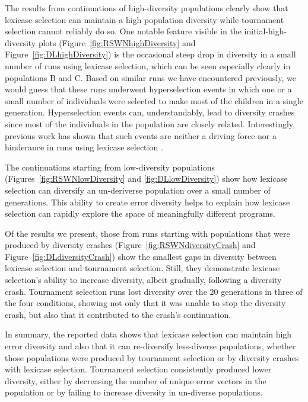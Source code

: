 \documentclass{sig-alternate-05-2015}
\begin{document}
The results from continuations of high-diversity populations clearly show that lexicase selection can maintain a high population diversity while tournament selection cannot reliably do so. One notable feature visible in the initial-high-diversity plots (Figure~\ref{fig:RSWNhighDiversity} and Figure~\ref{fig:DLhighDiversity}) is the occasional steep drop in diversity in a small number of runs using lexicase selection, which can be seen especially clearly in populations B and C. Based on similar runs we have encountered previously, we would guess that these runs underwent hyperselection events in which one or a small number of individuals were selected to make most of the children in a single generation. Hyperselection events can, understandably, lead to diversity crashes since most of the individuals in the population are closely related. Interestingly, previous work has shown that such events are neither a driving force nor a hinderance in runs using lexicase selection \cite{Helmuth:2016:GECCO}.

The continuations starting from low-diversity populations (Figures~\ref{fig:RSWNlowDiversity} and \ref{fig:DLlowDiversity}) show how lexicase selection can diversify an un-deriverse population over a small number of generations. This ability to create error diversity helps to explain how lexicase selection can rapidly explore the space of meaningfully different programs.


Of the results we present, those from runs starting with populations that were produced by diversity crashes (Figure~\ref{fig:RSWNdiversityCrash} and Figure~\ref{fig:DLdiversityCrash}) show the smallest gaps in diversity between lexicase selection and tournament selection. Still, they demonstrate lexicase selection's ability to increase diversity, albeit gradually, following a diversity crash. Tournament selection runs lost diversity over the 20 generations in three of the four conditions, showing not only that it was unable to stop the diversity crash, but also that it contributed to the crash's continuation.

In summary, the reported data shows that lexicase selection can maintain high error diversity and also that it can re-diversify less-diverse populations, whether those populations were produced by tournament selection or by diversity crashes with lexicase selection. Tournament selection consistently produced lower diversity, either by decreasing the number of unique error vectors in the population or by failing to increase diversity in un-diverse populations. 
\end{document}
